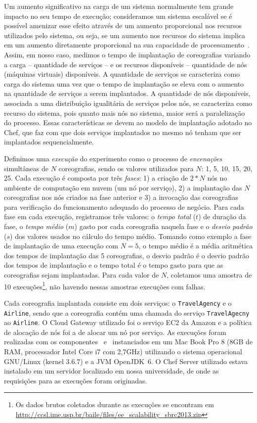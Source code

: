 Um aumento significativo na carga de um sistema normalmente tem grande impacto no seu tempo de execução; consideramos um sistema escalável se é possível amenizar esse efeito através de um aumento proporcional nos recursos utilizados pelo sistema, ou seja, se um aumento nos recursos do sistema implica em um aumento diretamente proporcional na sua capacidade de processamento~\cite{Law1998Scalable}. Assim, em nosso caso, medimos o tempo de implantação de coreografias variando a carga -- quantidade de serviços -- e os recursos disponíveis -- quantidade de nós (máquinas virtuais) disponíveis. A quantidade de serviços se caracteriza como carga do sistema uma vez que o tempo de implantação se eleva com o aumento na quantidade de serviços a serem implantados. A quantidade de nós disponíveis, associada a uma distribuição igualitária de serviços pelos nós, se caracteriza como recurso do sistema, pois quanto mais nós no sistema, maior será a paralelização do processo. Essas características se devem ao modelo de implantação adotado no Chef, que faz com que dois serviços implantados no mesmo nó tenham que ser implantados sequencialmente.

Definimos uma \emph{execução} do experimento como o processo de \emph{encenações} simultâneas de $N$ coreografias, sendo os valores utilizados para $N$: 1, 5, 10, 15, 20, 25. Cada execução é composta por três \emph{fases}: 1) a criação de $2*N$ nós no ambiente de computação em nuvem (um nó por serviço), 2) a implantação das $N$ coreografias nos nós criados na fase anterior e 3) a invocação das coreografias para verificação do funcionamento adequado do processo de negócio. Para cada fase em cada execução, registramos três valores: o \emph{tempo total} ($t$) de duração da fase, o \emph{tempo médio} ($m$) gasto por cada coreografia naquela fase e o \emph{desvio padrão} ($s$) dos valores usados no cálculo do tempo médio. Tomando como exemplo a fase de implantação de uma execução com $N=5$, o tempo médio é a média aritmética dos tempos de implantação das 5 coreografias, o desvio padrão é o desvio padrão dos tempos de implantação e o tempo total é o tempo gasto para que as coreografias sejam implantadas. Para cada valor de $N$, coletamos uma amostra de 10 execuções\footnote{Os dados brutos coletados durante as execuções se encontram em \\ \url{http://ccsl.ime.usp.br/baile/files/ee_scalability_sbrc2013.zip}}, não havendo nessas amostras execuções com falhas. 

Cada coreografia implantada consiste em dois serviços: o \texttt{TravelAgency} e o \texttt{Airline}, sendo que a coreografia contém uma chamada do serviço \texttt{TravelAgecny} ao \texttt{Airline}. O Cloud Gateway utilizado foi o serviço EC2 da Amazon e a política de alocação de nós foi a de alocar um nó por serviço. As execuções foram realizadas com os componentes \eecomp\ e \dm\ instanciados em um Mac Book Pro 8 (8GB de RAM, processador Intel Core i7 com 2,7GHz) utilizando o sistema operacional GNU/Linux (kernel 3.6.7) e a JVM OpenJDK~6. O Chef Server utilizado estava instalado em um servidor localizado em nossa universidade, de onde as requisições para as execuções foram originadas. 


